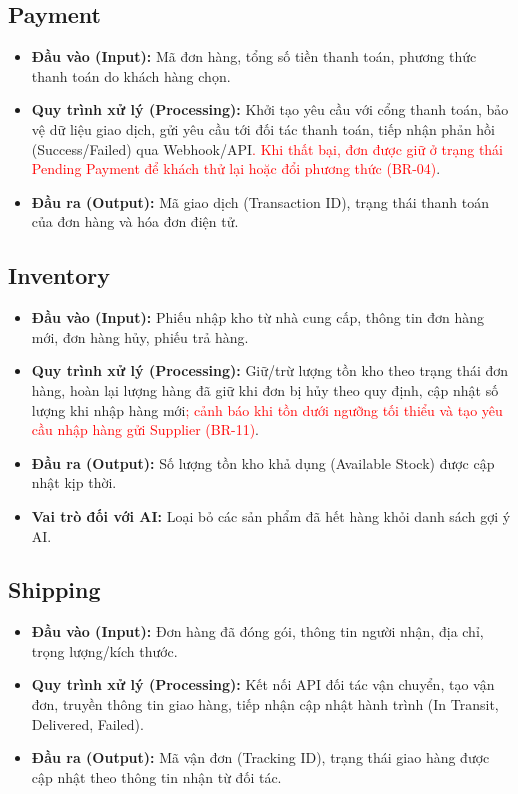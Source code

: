 \documentclass[12pt,a4paper,oneside]{report}
\newif\ifmark \marktrue
\newcommand{\chg}[1]{\ifmark\textcolor{red}{#1}\else #1\fi}
\begin{document}
\subsection{Payment}

\begin{itemize}
  \item \textbf{Đầu vào (Input):} Mã đơn hàng, tổng số tiền thanh toán, phương thức thanh toán do khách hàng chọn.
  \item \textbf{Quy trình xử lý (Processing):} Khởi tạo yêu cầu với cổng thanh toán, bảo vệ dữ liệu giao dịch, gửi yêu cầu tới đối tác thanh toán, tiếp nhận phản hồi (Success/Failed) qua Webhook/API\chg{. Khi thất bại, đơn được giữ ở trạng thái Pending Payment để khách thử lại hoặc đổi phương thức (BR-04)}.
  \item \textbf{Đầu ra (Output):} Mã giao dịch (Transaction ID), trạng thái thanh toán của đơn hàng và hóa đơn điện tử.
\end{itemize}

\subsection{Inventory}

\begin{itemize}
  \item \textbf{Đầu vào (Input):} Phiếu nhập kho từ nhà cung cấp, thông tin đơn hàng mới, đơn hàng hủy, phiếu trả hàng.
  \item \textbf{Quy trình xử lý (Processing):} Giữ/trừ lượng tồn kho theo trạng thái đơn hàng, hoàn lại lượng hàng đã giữ khi đơn bị hủy theo quy định, cập nhật số lượng khi nhập hàng mới\chg{; cảnh báo khi tồn dưới ngưỡng tối thiểu và tạo yêu cầu nhập hàng gửi Supplier (BR-11)}.
  \item \textbf{Đầu ra (Output):} Số lượng tồn kho khả dụng (Available Stock) được cập nhật kịp thời.
  \item \textbf{Vai trò đối với AI:} Loại bỏ các sản phẩm đã hết hàng khỏi danh sách gợi ý AI.
\end{itemize}

\subsection{Shipping}

\begin{itemize}
  \item \textbf{Đầu vào (Input):} Đơn hàng đã đóng gói, thông tin người nhận, địa chỉ, trọng lượng/kích thước.
  \item \textbf{Quy trình xử lý (Processing):} Kết nối API đối tác vận chuyển, tạo vận đơn, truyền thông tin giao hàng, tiếp nhận cập nhật hành trình (In Transit, Delivered, Failed).
  \item \textbf{Đầu ra (Output):} Mã vận đơn (Tracking ID), trạng thái giao hàng được cập nhật theo thông tin nhận từ đối tác.
\end{itemize}
\end{document}
